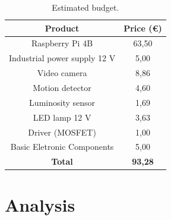 \documentclass[12pt, letterpaper]{report}
\begin{document}
\begin{table}[ht]
	\centering
	
	\begin{tabular}{||c | c||} 
		\hline
		\textbf{Product} & \textbf{Price (€)}\\
		\hline\hline
		Raspberry Pi 4B & 63,50\\\hline
		Industrial power supply 12 V & 5,00\\\hline
		Video camera & 8,86\\\hline
		Motion detector & 4,60\\\hline
		Luminosity sensor & 1,69\\\hline
		LED lamp 12 V & 3,63\\\hline
		Driver (MOSFET) & 1,00\\\hline
		Basic Eletronic Components & 5,00\\\hline
		\hline
		\textbf{Total} & \textbf{93,28}
		\\\hline
	\end{tabular}
	
		
	\caption{Estimated budget.}
	\label{table:data}
\end{table}




\chapter{Analysis}

\clearpage


\clearpage





\end{document}
